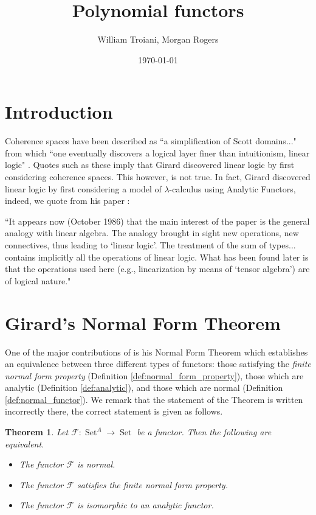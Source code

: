 \documentclass[12pt]{article}
\title{Polynomial functors}
\author{William Troiani, Morgan Rogers}
\date{\today}
\theoremstyle{plain}
\newtheorem{thm}{Theorem}[subsection] %
\theoremstyle{definition}
\newcommand{\scr}[1]{\mathscr{#1}}
\newcommand{\lto}{\longrightarrow}
\DeclareMathOperator{\set}{Set}
\begin{document}
	\maketitle
	\tableofcontents
	
	\section{Introduction}
	Coherence spaces have been described as ``a simplification of Scott domains..." from which ``one eventually discovers a logical layer finer than intuitionism, linear logic" \cite{BS}. Quotes such as these imply that Girard discovered linear logic by first considering coherence spaces. This however, is not true. In fact, Girard discovered linear logic by first considering a model of $\lambda$-calculus using Analytic Functors, indeed, we quote from his paper \cite{Girard}:
	
	\begin{displayquote}
		``It appears now (October 1986) that the main interest of the paper is the general analogy with linear algebra. The analogy brought in sight new operations, new connectives, thus leading to `linear logic'. The treatment of the sum of types... contains implicitly all the operations of linear logic. What has been found later is that the operations used here (e.g., linearization by means of `tensor algebra') are of logical nature."
		\end{displayquote}
	
	\section{Girard's Normal Form Theorem}
One of the major contributions of \cite{Girard} is his Normal Form Theorem \cite[Theorem 2.8]{Girard} which establishes an equivalence between three different types of functors: those satisfying the \emph{finite normal form property} (Definition \ref{def:normal_form_property}), those which are analytic (Definition \ref{def:analytic}), and those which are normal (Definition \ref{def:normal_functor}). We remark that the statement of the Theorem is written incorrectly there, the correct statement is given as follows.
 
\begin{thm}\label{thm:normal_form_theorem}
    Let $\scr{F}: \set^A \lto \set$ be a functor. Then the following are equivalent.
    \begin{itemize}
        \item The functor $\scr{F}$ is normal.
        \item The functor $\scr{F}$ satisfies the finite normal form property.
        \item The functor $\scr{F}$ is isomorphic to an analytic functor.
    \end{itemize}
\end{thm}
\end{document}
